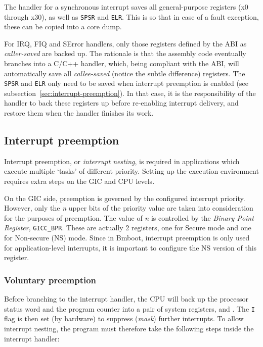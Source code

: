 The handler for a synchronous interrupt saves all general-purpose registers (x0 through x30), as well as \texttt{SPSR} and \texttt{ELR}. This is so that in case of a fault exception, these can be copied into a core dump.

For IRQ, FIQ and SError handlers, only those registers defined by the ABI as \textit{caller-saved} are backed up. The rationale is that the assembly code eventually branches into a C/C++ handler, which, being compliant with the ABI, will automatically save all \textit{callee-saved} (notice the subtle difference) registers. The \texttt{SPSR} and \texttt{ELR} only need to be saved when interrupt preemption is enabled (see subsection~\ref{sec:interrupt-preemption}). In that case, it is the responsibility of the handler to back these registers up before re-enabling interrupt delivery, and restore them when the handler finishes its work.

\subsection{Interrupt preemption \label{sec:interrupt-preemption}}

Interrupt preemption, or \textit{interrupt nesting}, is required in applications which execute multiple `tasks' of different priority.
Setting up the execution environment requires extra steps on the GIC and CPU levels.

On the GIC side, preemption is governed by the configured interrupt priority. However, only the \textit{n} upper bits of the priority value are taken into consideration for the purposes of preemption. The value of \textit{n} is controlled by the \textit{Binary Point Register}, \texttt{GICC\_BPR}. These are actually 2 registers, one for Secure mode and one for Non-secure (NS) mode. Since in Bmboot, interrupt preemption is only used for application-level interrupts, it is important to configure the NS version of this register.

\subsubsection{Voluntary preemption}

Before branching to the interrupt handler, the CPU will back up the processor status word and the program counter into a pair of system registers, \SPSRELn and \ELRELn. The \texttt{I} flag is then set (by hardware) to suppress (\textit{mask}) further interrupts. To allow interrupt nesting, the program must therefore take the following steps inside the interrupt handler:


